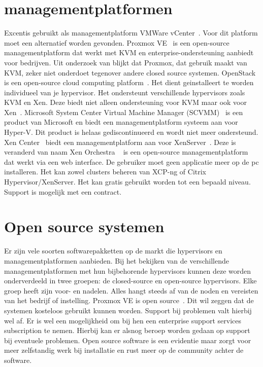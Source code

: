 \section{managementplatformen}
Excentis gebruikt als managementplatform VMWare vCenter~\autocite{vmware}. Voor dit platform moet een alternatief worden gevonden.
Proxmox VE~\autocite{Proxmox} is een open-source managementplatform dat werkt met KVM en enterprise-ondersteuning aanbiedt voor bedrijven. Uit onderzoek van \textcite{ally2018comparative} blijkt dat Proxmox, dat gebruik maakt van KVM, zeker niet onderdoet tegenover andere closed source systemen.
OpenStack is een open-source cloud computing platform~\autocite{openstack2024}. Het dient geinstalleert te worden individueel van je hypervisor. Het ondersteunt verschillende hypervisors zoals KVM en Xen.
Deze biedt niet alleen ondersteuning voor KVM maar ook voor Xen~\autocite{oleksiuk2023comparative}.
Microsoft System Center Virtual Machine Manager (SCVMM)~\autocite{microsoftvmm2025} is een product van Microsoft en biedt een managementplatform systeem aan voor Hyper-V. Dit product is helaas gediscontinueerd en wordt niet meer ondersteund.
Xen Center~\autocite{xencenter2024} biedt een managementplatform aan voor XenServer~\autocite{xenserverwebsite}. Deze is veranderd van naam 
Xen Orchestra ~\autocite{el2021server} is een open-source managementplatform dat werkt via een web interface. De gebruiker moet geen applicatie meer op de pc installeren. Het kan zowel clusters beheren van XCP-ng of Citrix Hypervisor/XenServer.
Het kan gratis gebruikt worden tot een bepaald niveau. Support is mogelijk met een contract.
\section{Open source systemen}
Er zijn vele soorten softwarepakketten op de markt die hypervisors en managementplatformen aanbieden. Bij het bekijken van de verschillende managementplatformen met hun bijbehorende hypervisors kunnen deze worden onderverdeeld in twee groepen: de closed-source en open-source hypervisors. Elke groep heeft zijn voor- en nadelen. Alles hangt steeds af van de noden en vereisten van het bedrijf of instelling.
Proxmox VE is open source~\autocite{Proxmox}. Dit wil zeggen dat de systemen kosteloos gebruikt kunnen worden. Support bij problemen valt hierbij wel af. Er is wel een mogelijkheid om bij hen een enterprise support services subscription te nemen. Hierbij kan er alsnog beroep worden gedaan op support bij eventuele problemen.
Open source software is een evidentie maar zorgt voor meer zelfstandig werk bij installatie en rust meer op de community achter de software.

